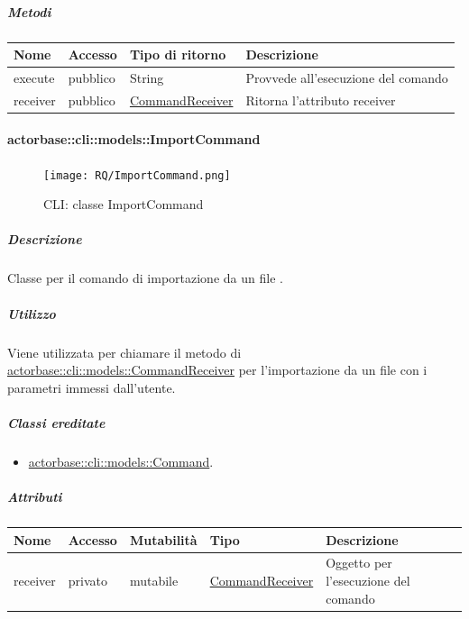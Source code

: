 \documentclass{scalatekids-article}
\begin{document}
\subparagraph{Metodi}

\begin{tabular}{| l | l | l | l |}
  \hline
  Nome & Accesso & Tipo di ritorno & Descrizione\\
  \hline
  execute & pubblico & String & Provvede all'esecuzione del comando\\
  \hline
  receiver & pubblico & \hyperref[sec:actorbase::cli::models::CommandReceiver]{CommandReceiver} & Ritorna l'attributo receiver\\
  \hline
\end{tabular}

\paragraph{actorbase::cli::models::ImportCommand}
\label{sec:actorbase::cli::models::ImportCommand}

\begin{figure}[H]
  \begin{center}
    \texttt{[image: RQ/ImportCommand.png]}
    \caption{CLI: classe ImportCommand}
  \end{center}
\end{figure}

\subparagraph{Descrizione}

Classe per il comando di importazione da un file .

\subparagraph{Utilizzo}

Viene utilizzata per chiamare il metodo di
\hyperref[sec:actorbase::cli::models::CommandReceiver]{actorbase::cli::models::CommandReceiver} per l'importazione da un file
 con i parametri immessi dall'utente.

\subparagraph{Classi ereditate}

\begin{itemize}
\item \hyperref[sec:actorbase::cli::models::Command]{actorbase::cli::models::Command}.
\end{itemize}

\subparagraph{Attributi}
\begin{tabular}{| p{1cm} | p{1.5cm} | p{2cm} | p{4cm} | p{8.5cm} |}
  \hline
  Nome & Accesso & Mutabilità & Tipo & Descrizione\\
  \hline
  receiver & privato & mutabile & \hyperref[sec:actorbase::cli::models::CommandReceiver]{CommandReceiver} & Oggetto per l'esecuzione del comando\\
  \hline
\end{tabular}
\end{document}
